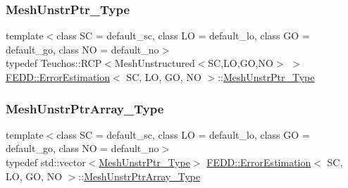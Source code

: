 \mbox{\label{classFEDD_1_1ErrorEstimation_a862043dc355a1524640b5ef53e8eefa1}} 
\subsubsection{\texorpdfstring{Mesh\+Unstr\+Ptr\+\_\+\+Type}{MeshUnstrPtr\_Type}}
{\footnotesize\ttfamily template$<$class SC = default\+\_\+sc, class LO = default\+\_\+lo, class GO = default\+\_\+go, class NO = default\+\_\+no$>$ \\
typedef Teuchos\+::\+R\+CP$<$Mesh\+Unstructured$<$SC,LO,GO,NO$>$ $>$ \hyperlink{classFEDD_1_1ErrorEstimation}{F\+E\+D\+D\+::\+Error\+Estimation}$<$ SC, LO, GO, NO $>$\+::\hyperlink{classFEDD_1_1ErrorEstimation_a862043dc355a1524640b5ef53e8eefa1}{Mesh\+Unstr\+Ptr\+\_\+\+Type}}

\mbox{\label{classFEDD_1_1ErrorEstimation_ad64dcc59dd00c37ff85f641e52644916}} 
\subsubsection{\texorpdfstring{Mesh\+Unstr\+Ptr\+Array\+\_\+\+Type}{MeshUnstrPtrArray\_Type}}
{\footnotesize\ttfamily template$<$class SC = default\+\_\+sc, class LO = default\+\_\+lo, class GO = default\+\_\+go, class NO = default\+\_\+no$>$ \\
typedef std\+::vector$<$\hyperlink{classFEDD_1_1ErrorEstimation_a862043dc355a1524640b5ef53e8eefa1}{Mesh\+Unstr\+Ptr\+\_\+\+Type}$>$ \hyperlink{classFEDD_1_1ErrorEstimation}{F\+E\+D\+D\+::\+Error\+Estimation}$<$ SC, LO, GO, NO $>$\+::\hyperlink{classFEDD_1_1ErrorEstimation_ad64dcc59dd00c37ff85f641e52644916}{Mesh\+Unstr\+Ptr\+Array\+\_\+\+Type}}

\mbox{\label{classFEDD_1_1ErrorEstimation_a1c6fa9610a1e5e887e5a88ab33f1c792}} 
